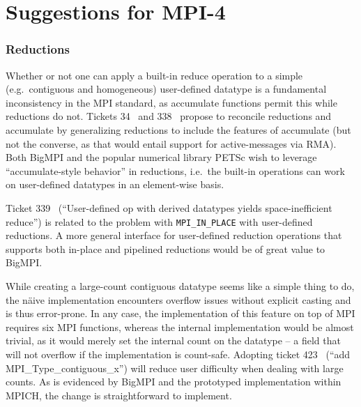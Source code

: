
\section{Suggestions for MPI-4}
\label{sec:mpi4}

\subsubsection{Reductions}

Whether or not one can apply a built-in reduce operation to a simple 
(e.g.\ contiguous and homogeneous) user-defined datatype
is a fundamental inconsistency in the MPI standard, as accumulate
functions permit this while reductions do not.
Tickets 34~\cite{ticket34} and 338~\cite{ticket338}
propose to reconcile reductions and accumulate by generalizing
reductions to include the features of accumulate
(but not the converse, as that would entail support for active-messages via RMA).
Both BigMPI and the popular numerical library PETSc wish to leverage 
``accumulate-style behavior'' in reductions, i.e.\  the built-in operations 
can work on user-defined datatypes in an element-wise basis.

Ticket 339~\cite{ticket339} %
(``User-defined op with derived datatypes yields space-inefficient reduce'')
is related to the problem with \texttt{MPI\_IN\_PLACE} with user-defined reductions.
A more general interface for user-defined reduction operations that supports both
in-place and pipelined reductions would be of great value to BigMPI.

While creating a large-count contiguous datatype seems like a simple thing to do,
the n{\"a}ive implementation encounters overflow issues without explicit casting and is
thus error-prone.  In any case, the implementation of this feature on top of MPI
requires six MPI functions, whereas the internal implementation would be almost trivial,
as it would merely set the internal count on the datatype -- a field that will not overflow 
if the implementation is count-safe.
Adopting ticket 423~\cite{ticket423} %
(``add MPI\_Type\_contiguous\_x'') will reduce user difficulty when dealing with large counts.
As is evidenced by BigMPI and the prototyped implementation within MPICH, 
the change is straightforward to implement.


